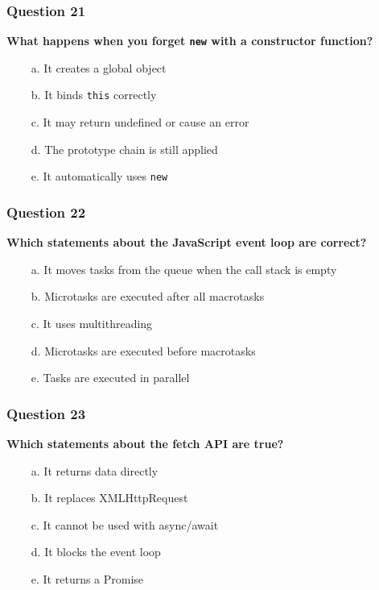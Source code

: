 \documentclass{article}
\newcommand{\cmark}{\textcolor{green}{\ding{51}}} %
\newcommand{\xmark}{\textcolor{red}{\ding{55}}}   %
\begin{document}
\subsubsection*{Question 21}
\textbf{What happens when you forget \texttt{new} with a constructor function?}

\begin{itemize}
  \item[\xmark\ a.] It creates a global object
  \item[\xmark\ b.] It binds \texttt{this} correctly
  \item[\cmark\ c.] It may return undefined or cause an error
  \item[\xmark\ d.] The prototype chain is still applied
  \item[\xmark\ e.] It automatically uses \texttt{new}
\end{itemize}

\subsubsection*{Question 22}
\textbf{Which statements about the JavaScript event loop are correct?}

\begin{itemize}
  \item[\cmark\ a.] It moves tasks from the queue when the call stack is empty
  \item[\xmark\ b.] Microtasks are executed after all macrotasks
  \item[\xmark\ c.] It uses multithreading
  \item[\cmark\ d.] Microtasks are executed before macrotasks
  \item[\xmark\ e.] Tasks are executed in parallel
\end{itemize}

\subsubsection*{Question 23}
\textbf{Which statements about the fetch API are true?}

\begin{itemize}
  \item[\xmark\ a.] It returns data directly
  \item[\cmark\ b.] It replaces XMLHttpRequest
  \item[\xmark\ c.] It cannot be used with async/await
  \item[\xmark\ d.] It blocks the event loop
  \item[\cmark\ e.] It returns a Promise
\end{itemize}
\end{document}
